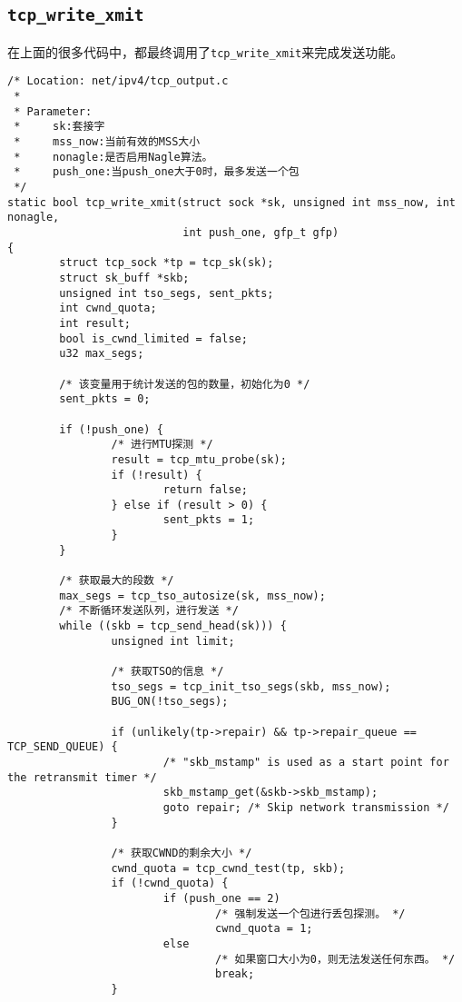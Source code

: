 \subsection{\texttt{tcp_write_xmit}}
在上面的很多代码中，都最终调用了\texttt{tcp_write_xmit}来完成发送功能。
\begin{verbatim}
/* Location: net/ipv4/tcp_output.c
 *
 * Parameter:
 *     sk:套接字
 *     mss_now:当前有效的MSS大小
 *     nonagle:是否启用Nagle算法。
 *     push_one:当push_one大于0时，最多发送一个包
 */
static bool tcp_write_xmit(struct sock *sk, unsigned int mss_now, int nonagle,
                           int push_one, gfp_t gfp)
{
        struct tcp_sock *tp = tcp_sk(sk);
        struct sk_buff *skb;
        unsigned int tso_segs, sent_pkts;
        int cwnd_quota;
        int result;
        bool is_cwnd_limited = false;
        u32 max_segs;

        /* 该变量用于统计发送的包的数量，初始化为0 */
        sent_pkts = 0;

        if (!push_one) {
                /* 进行MTU探测 */
                result = tcp_mtu_probe(sk);
                if (!result) {
                        return false;
                } else if (result > 0) {
                        sent_pkts = 1;
                }
        }

        /* 获取最大的段数 */
        max_segs = tcp_tso_autosize(sk, mss_now);
        /* 不断循环发送队列，进行发送 */
        while ((skb = tcp_send_head(sk))) {
                unsigned int limit;

                /* 获取TSO的信息 */
                tso_segs = tcp_init_tso_segs(skb, mss_now);
                BUG_ON(!tso_segs);

                if (unlikely(tp->repair) && tp->repair_queue == TCP_SEND_QUEUE) {
                        /* "skb_mstamp" is used as a start point for the retransmit timer */
                        skb_mstamp_get(&skb->skb_mstamp);
                        goto repair; /* Skip network transmission */
                }

                /* 获取CWND的剩余大小 */
                cwnd_quota = tcp_cwnd_test(tp, skb);
                if (!cwnd_quota) {
                        if (push_one == 2)
                                /* 强制发送一个包进行丢包探测。 */
                                cwnd_quota = 1;
                        else
                                /* 如果窗口大小为0，则无法发送任何东西。 */
                                break;
                }


\end{verbatim}
